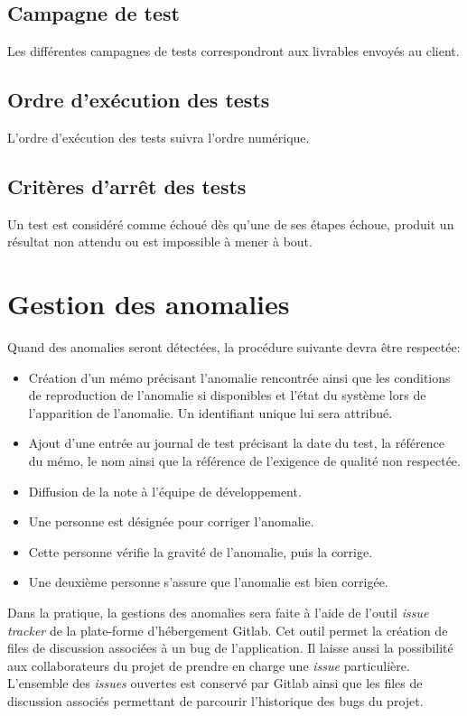\documentclass{../res/univ-projet}
\begin{document}
\subsection{Campagne de test}

Les différentes campagnes de tests correspondront aux livrables envoyés au client.

\subsection{Ordre d'exécution des tests}

L'ordre d'exécution des tests suivra l'ordre numérique.

\subsection{Critères d'arrêt des tests}

Un test est considéré comme échoué dès qu'une de ses étapes échoue, produit un résultat non attendu ou est impossible à mener à bout.


\section{Gestion des anomalies}

Quand des anomalies seront détectées, la procédure suivante devra être respectée:
  \begin{itemize}
   \item Création d'un mémo précisant l'anomalie rencontrée ainsi que les conditions de reproduction de l'anomalie si disponibles et l'état du système lors de l'apparition de l'anomalie.  
   Un identifiant unique lui sera attribué.
   \item Ajout d'une entrée au journal de test précisant la date du test, la référence du mémo, le nom ainsi que la référence de l'exigence de 
   qualité non respectée.
   \item Diffusion de la note à l'équipe de développement.
   \item Une personne est désignée pour corriger l'anomalie.
   \item Cette personne vérifie la gravité de l'anomalie, puis la corrige.
   \item Une deuxième personne s'assure que l'anomalie est bien corrigée.
  \end{itemize}
  

  Dans la pratique, la gestions des anomalies sera faite à l'aide de l'outil \emph{issue tracker} de
  la plate-forme d'hébergement Gitlab. Cet outil permet la création de files de discussion associées à un bug
  de l'application. Il laisse aussi la possibilité aux collaborateurs du projet de prendre en charge 
  une \emph{issue} particulière. L'ensemble des \emph{issues} ouvertes est conservé par Gitlab ainsi
  que les files de discussion associés permettant de parcourir l'historique des bugs du projet.
\end{document}
